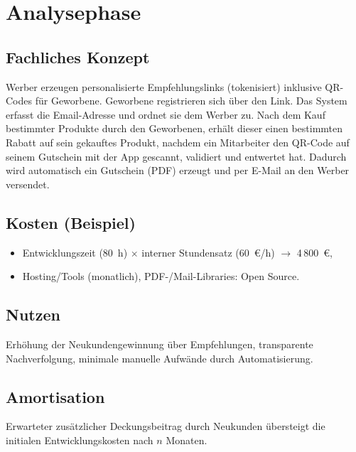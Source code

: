 \section{Analysephase}
\label{sec:Analysephase}

\subsection{Fachliches Konzept}
Werber erzeugen personalisierte Empfehlungslinks (tokenisiert) inklusive QR-Codes für Geworbene. Geworbene registrieren sich über den Link. Das System erfasst die Email-Adresse und ordnet sie dem Werber zu. Nach dem Kauf bestimmter Produkte durch den Geworbenen, erhält dieser einen bestimmten Rabatt auf sein gekauftes Produkt, nachdem ein Mitarbeiter den QR-Code auf seinem Gutschein mit der App gescannt, validiert und entwertet hat. Dadurch wird automatisch ein Gutschein (PDF) erzeugt und per E-Mail an den Werber versendet.

\subsection{Kosten (Beispiel)}
\begin{itemize}
  \item Entwicklungszeit (80~h) \(\times\) interner Stundensatz (60~€/h) \(\rightarrow\) 4\,800~€,
  \item Hosting/Tools (monatlich), PDF-/Mail-Libraries: Open Source.
\end{itemize}

\subsection{Nutzen}
Erhöhung der Neukundengewinnung über Empfehlungen, transparente Nachverfolgung, minimale manuelle Aufwände durch Automatisierung.

\subsection{Amortisation}
Erwarteter zusätzlicher Deckungsbeitrag durch Neukunden übersteigt die initialen Entwicklungskosten nach \(n\) Monaten.
\cleardoublepage